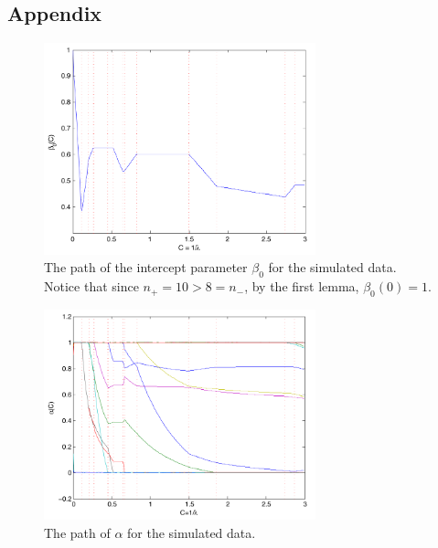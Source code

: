 \documentclass[10pt]{article}
\theoremstyle{definition}
\begin{document}
\subsection{Appendix}
\begin{center}
\begin{figure}[!h]
   \centering
   \includegraphics[width=0.7\textwidth]{./beta0Path.pdf} 
      \caption{The path of the intercept parameter $\beta_0$ for the simulated data. Notice that since $n_+=10>8=n_-$, by the first lemma, $\beta_0(0)=1$.}
   \label{fig:beta0Path}
\end{figure}
\end{center}

\begin{center}
\begin{figure}[!h]
   \centering
   \includegraphics[width=0.7\textwidth]{./alphaPath.pdf} 
      \caption{The path of $\alpha$ for the simulated data.}
   \label{fig:alphaPath}
\end{figure}
\end{center}




\end{document}
